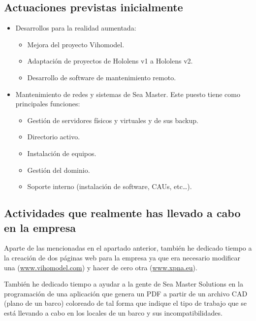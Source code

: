 \documentclass[12pt,letterpaper]{article}
\begin{document}
\subsection{Actuaciones previstas inicialmente}
\begin{itemize}
	\item Desarrollos para la realidad aumentada:
	\begin{itemize}
		\item Mejora del proyecto Vihomodel.
		\item Adaptación de proyectos de Hololens v1 a Hololens v2.
		\item Desarrollo de software de mantenimiento remoto.
	\end{itemize}
	\item Mantenimiento de redes y sistemas de Sea Master. Este puesto tiene como principales funciones:
	\begin{itemize}
		\item Gestión de servidores físicos y virtuales y de sus backup.
		\item Directorio activo.
		\item Instalación de equipos.
		\item Gestión del dominio.
		\item Soporte interno (instalación de software, CAUs, etc…).
	\end{itemize}
\end{itemize}


\subsection{Actividades que realmente has llevado a cabo en la empresa}
Aparte de las mencionadas en el apartado anterior, también he dedicado tiempo a la creación de dos páginas web para la empresa ya que era necesario modificar una (\url{www.vihomodel.com}) y hacer de cero otra (\url{www.xpna.eu}).

También he dedicado tiempo a ayudar a la gente de Sea Master Solutions en la programación de una aplicación que genera un PDF a partir de un archivo CAD (plano de un barco) coloreado de tal forma que indique el tipo de trabajo que se está llevando a cabo en los locales de un barco y sus incompatibilidades.
\end{document}
